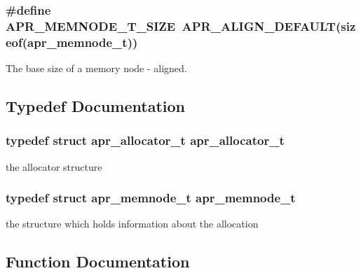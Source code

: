 \subsubsection[{\texorpdfstring{A\+P\+R\+\_\+\+M\+E\+M\+N\+O\+D\+E\+\_\+\+T\+\_\+\+S\+I\+ZE}{APR_MEMNODE_T_SIZE}}]{\setlength{\rightskip}{0pt plus 5cm}\#define A\+P\+R\+\_\+\+M\+E\+M\+N\+O\+D\+E\+\_\+\+T\+\_\+\+S\+I\+ZE~{\bf A\+P\+R\+\_\+\+A\+L\+I\+G\+N\+\_\+\+D\+E\+F\+A\+U\+LT}(sizeof({\bf apr\+\_\+memnode\+\_\+t}))}\hypertarget{group__apr__allocator_gaf382851817012929f4e2458b43f4482c}{}\label{group__apr__allocator_gaf382851817012929f4e2458b43f4482c}
The base size of a memory node -\/ aligned. 

\subsection{Typedef Documentation}
\subsubsection[{\texorpdfstring{apr\+\_\+allocator\+\_\+t}{apr_allocator_t}}]{\setlength{\rightskip}{0pt plus 5cm}typedef struct {\bf apr\+\_\+allocator\+\_\+t} {\bf apr\+\_\+allocator\+\_\+t}}\hypertarget{group__apr__allocator_ga1ceabfd30fcfc455e47d052d2a24244b}{}\label{group__apr__allocator_ga1ceabfd30fcfc455e47d052d2a24244b}
the allocator structure 
\subsubsection[{\texorpdfstring{apr\+\_\+memnode\+\_\+t}{apr_memnode_t}}]{\setlength{\rightskip}{0pt plus 5cm}typedef struct {\bf apr\+\_\+memnode\+\_\+t} {\bf apr\+\_\+memnode\+\_\+t}}\hypertarget{group__apr__allocator_ga3b6437036dfcdffbf87ad4677c818211}{}\label{group__apr__allocator_ga3b6437036dfcdffbf87ad4677c818211}
the structure which holds information about the allocation 

\subsection{Function Documentation}

